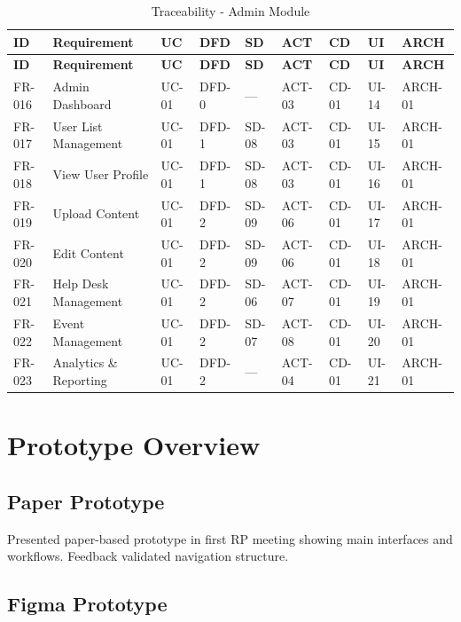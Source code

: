 \documentclass[12pt,a4paper]{article}
\begin{document}
\begin{longtable}{|p{1cm}|p{3cm}|p{0.7cm}|p{0.8cm}|p{0.7cm}|p{0.7cm}|p{0.7cm}|p{0.7cm}|p{0.9cm}|}
\caption{Traceability - Admin Module} \\
\hline
\textbf{ID} & \textbf{Requirement} & \textbf{UC} & \textbf{DFD} & \textbf{SD} & \textbf{ACT} & \textbf{CD} & \textbf{UI} & \textbf{ARCH} \\
\hline
\endfirsthead
\hline
\textbf{ID} & \textbf{Requirement} & \textbf{UC} & \textbf{DFD} & \textbf{SD} & \textbf{ACT} & \textbf{CD} & \textbf{UI} & \textbf{ARCH} \\
\hline
\endhead
FR-016 & Admin Dashboard & UC-01 & DFD-0 & — & ACT-03 & CD-01 & UI-14 & ARCH-01 \\
\hline
FR-017 & User List Management & UC-01 & DFD-1 & SD-08 & ACT-03 & CD-01 & UI-15 & ARCH-01 \\
\hline
FR-018 & View User Profile & UC-01 & DFD-1 & SD-08 & ACT-03 & CD-01 & UI-16 & ARCH-01 \\
\hline
FR-019 & Upload Content & UC-01 & DFD-2 & SD-09 & ACT-06 & CD-01 & UI-17 & ARCH-01 \\
\hline
FR-020 & Edit Content & UC-01 & DFD-2 & SD-09 & ACT-06 & CD-01 & UI-18 & ARCH-01 \\
\hline
FR-021 & Help Desk Management & UC-01 & DFD-2 & SD-06 & ACT-07 & CD-01 & UI-19 & ARCH-01 \\
\hline
FR-022 & Event Management & UC-01 & DFD-2 & SD-07 & ACT-08 & CD-01 & UI-20 & ARCH-01 \\
\hline
FR-023 & Analytics \& Reporting & UC-01 & DFD-2 & — & ACT-04 & CD-01 & UI-21 & ARCH-01 \\
\hline
\end{longtable}

\clearpage

\section{Prototype Overview}

\subsection{Paper Prototype}

Presented paper-based prototype in first RP meeting showing main interfaces and workflows. Feedback validated navigation structure.

\subsection{Figma Prototype}
\end{document}
